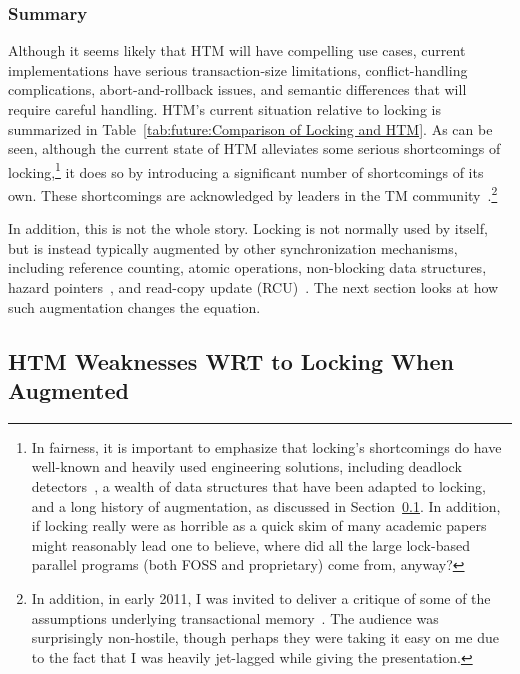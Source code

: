 \subsubsection{Summary}
\label{sec:future:HTM Weaknesses WRT Locking: Summary}



Although it seems likely that HTM will have compelling use cases,
current implementations have serious transaction-size limitations,
conflict-handling complications, abort-and-rollback issues, and
semantic differences that will require careful handling.
HTM's current situation relative to locking is summarized in
Table~\ref{tab:future:Comparison of Locking and HTM}.
As can be seen, although the current state of HTM alleviates some
serious shortcomings of locking,\footnote{
	In fairness, it is important to emphasize that locking's shortcomings
	do have well-known and heavily used engineering solutions, including
	deadlock detectors~\cite{JonathanCorbet2006lockdep}, a wealth
	of data structures that have been adapted to locking, and
	a long history of augmentation, as discussed in
	Section~\ref{sec:future:HTM Weaknesses WRT to Locking When Augmented}.
	In addition, if locking really were as horrible as a quick skim
	of many academic papers might reasonably lead one to believe,
	where did all the large lock-based parallel programs (both
	FOSS and proprietary) come from, anyway?}
it does so by introducing a significant
number of shortcomings of its own.
These shortcomings are acknowledged by leaders in the TM
community~\cite{AlexanderMatveev2012PessimisticTM}.\footnote{
	In addition, in early 2011, I was invited to deliver a critique of
	some of the assumptions underlying transactional
	memory~\cite{PaulEMcKenney2011Verico}.
	The audience was surprisingly non-hostile, though perhaps they
	were taking it easy on me due to the fact that I was heavily
	jet-lagged while giving the presentation.}

In addition, this is not the whole story.
Locking is not normally used by itself, but is instead typically
augmented by other synchronization mechanisms,
including reference counting, atomic operations, non-blocking data structures,
hazard pointers~\cite{MagedMichael04a,HerlihyLM02},
and read-copy update (RCU)~\cite{McKenney98,McKenney01a,ThomasEHart2007a,PaulEMcKenney2012ELCbattery}.
The next section looks at how such augmentation changes the equation.

\subsection{HTM Weaknesses WRT to Locking When Augmented}
\label{sec:future:HTM Weaknesses WRT to Locking When Augmented}

